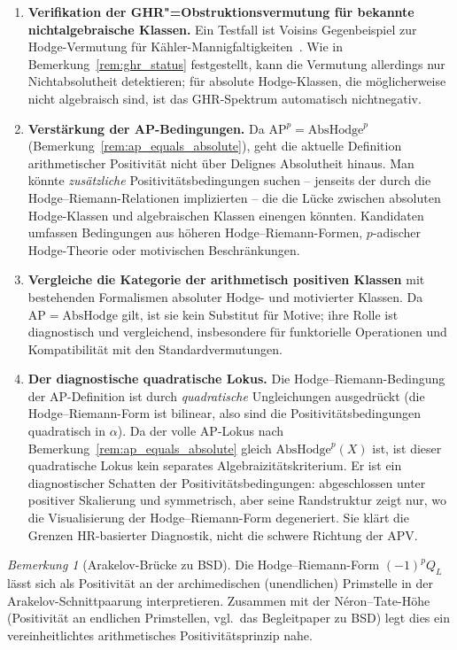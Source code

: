\documentclass[aps,prd,twocolumn,superscriptaddress,nofootinbib]{revtex4-2}
\theoremstyle{definition}
\theoremstyle{remark}
\newtheorem{remark}[theorem]{Bemerkung}
\begin{document}
\begin{enumerate}
\item \textbf{Verifikation der GHR"=Obstruktionsvermutung für bekannte nichtalgebraische Klassen.} Ein Testfall ist Voisins Gegenbeispiel zur Hodge-Vermutung für Kähler-Mannigfaltigkeiten~\cite{Voisin2002b}. Wie in Bemerkung~\ref{rem:ghr_status} festgestellt, kann die Vermutung allerdings nur Nichtabsolutheit detektieren; für absolute Hodge-Klassen, die möglicherweise nicht algebraisch sind, ist das GHR-Spektrum automatisch nichtnegativ.

\item \textbf{Verstärkung der AP-Bedingungen.} Da $\mathrm{AP}^p = \mathrm{AbsHodge}^p$ (Bemerkung~\ref{rem:ap_equals_absolute}), geht die aktuelle Definition arithmetischer Positivität nicht über Delignes Absolutheit hinaus. Man könnte \textit{zusätzliche} Positivitätsbedingungen suchen -- jenseits der durch die Hodge--Riemann-Relationen implizierten -- die die Lücke zwischen absoluten Hodge-Klassen und algebraischen Klassen einengen könnten. Kandidaten umfassen Bedingungen aus höheren Hodge--Riemann-Formen, $p$-adischer Hodge-Theorie oder motivischen Beschränkungen.

\item \textbf{Vergleiche die Kategorie der arithmetisch positiven Klassen} mit bestehenden Formalismen absoluter Hodge- und motivierter Klassen. Da $\mathrm{AP}=\mathrm{AbsHodge}$ gilt, ist sie kein Substitut für Motive; ihre Rolle ist diagnostisch und vergleichend, insbesondere für funktorielle Operationen und Kompatibilität mit den Standardvermutungen.

\item \textbf{Der diagnostische quadratische Lokus.} Die Hodge--Riemann-Bedingung der AP-Definition ist durch \emph{quadratische} Ungleichungen ausgedrückt (die Hodge--Riemann-Form ist bilinear, also sind die Positivitätsbedingungen quadratisch in $\alpha$). Da der volle AP-Lokus nach Bemerkung~\ref{rem:ap_equals_absolute} gleich $\mathrm{AbsHodge}^p(X)$ ist, ist dieser quadratische Lokus kein separates Al\-ge\-bra\-i\-zi\-täts\-kri\-te\-ri\-um. Er ist ein diagnostischer Schatten der Po\-si\-ti\-vi\-täts\-be\-din\-gun\-gen: abgeschlossen unter positiver Skalierung und symmetrisch, aber seine Randstruktur zeigt nur, wo die Visualisierung der Hodge--Riemann-Form degeneriert. Sie klärt die Grenzen HR-basierter Diagnostik, nicht die schwere Richtung der APV.
\end{enumerate}


\begin{remark}[Arakelov-Brücke zu BSD]
\label{rem:arakelov-bridge}
Die Hodge--Riemann-Form $(-1)^p Q_L$ lässt sich als Positivität an der archimedischen (unendlichen) Primstelle in der Arakelov-Schnittpaarung interpretieren. Zusammen mit der Néron--Tate-Höhe (Positivität an endlichen Primstellen, vgl.\ das Begleitpaper zu BSD) legt dies ein vereinheitlichtes arithmetisches Positivitätsprinzip nahe.
\end{remark}
\end{document}
